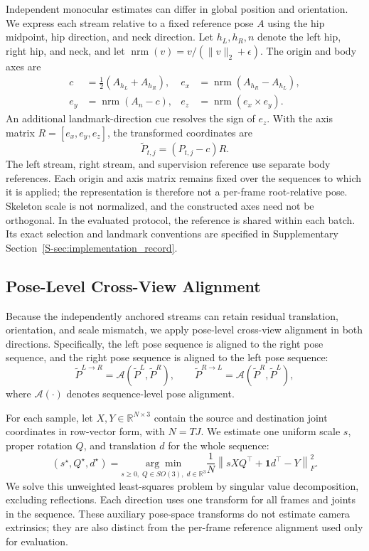\documentclass[preprint,12pt]{elsarticle}
\begin{document}
Independent monocular estimates can differ in global position and orientation. We express each stream relative to a fixed reference pose \(A\) using the hip midpoint, hip direction, and neck direction. Let \(h_L,h_R,n\) denote the left hip, right hip, and neck, and let \(\operatorname{nrm}(v)=v/(\|v\|_2+\epsilon)\). The origin and body axes are
\[
\begin{aligned}
c&=\tfrac12(A_{h_L}+A_{h_R}), &
e_x&=\operatorname{nrm}(A_{h_R}-A_{h_L}),\\
e_y&=\operatorname{nrm}(A_n-c), &
e_z&=\operatorname{nrm}(e_x\times e_y).
\end{aligned}
\]
An additional landmark-direction cue resolves the sign of \(e_z\). With the axis matrix \(R=[e_x,e_y,e_z]\), the transformed coordinates are
\[
\tilde{P}_{t,j}=(P_{t,j}-c)R.
\]
The left stream, right stream, and supervision reference use separate body references. Each origin and axis matrix remains fixed over the sequences to which it is applied; the representation is therefore not a per-frame root-relative pose. Skeleton scale is not normalized, and the constructed axes need not be orthogonal. In the evaluated protocol, the reference is shared within each batch. Its exact selection and landmark conventions are specified in Supplementary Section~\ref{S-sec:implementation_record}.

\subsection{Pose-Level Cross-View Alignment}
\label{subsec:pose_alignment}

Because the independently anchored streams can retain residual translation, orientation, and scale mismatch, we apply pose-level cross-view alignment in both directions. Specifically, the left pose sequence is aligned to the right pose sequence, and the right pose sequence is aligned to the left pose sequence:
\[
\tilde{P}^{L \rightarrow R} = \mathcal{A}(\tilde{P}^{L}, \tilde{P}^{R}),
\qquad
\tilde{P}^{R \rightarrow L} = \mathcal{A}(\tilde{P}^{R}, \tilde{P}^{L}),
\]
where \(\mathcal{A}(\cdot)\) denotes sequence-level pose alignment.

For each sample, let \(X,Y\in\mathbb{R}^{N\times3}\) contain the source and destination joint coordinates in row-vector form, with \(N=TJ\). We estimate one uniform scale \(s\), proper rotation \(Q\), and translation \(d\) for the whole sequence:
\[
(s^\star,Q^\star,d^\star)=
\underset{s\geq0,\;Q\in SO(3),\;d\in\mathbb{R}^{3}}{\arg\min}
\frac{1}{N}\left\|sXQ^\top+\mathbf{1}d^\top-Y\right\|_F^2.
\]
We solve this unweighted least-squares problem by singular value decomposition, excluding reflections. Each direction uses one transform for all frames and joints in the sequence. These auxiliary pose-space transforms do not estimate camera extrinsics; they are also distinct from the per-frame reference alignment used only for evaluation.
\end{document}
